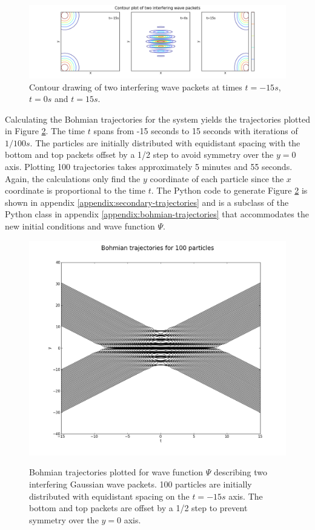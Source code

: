 \documentclass[10pt, reqno]{article}
\begin{document}
  \begin{figure}[!ht]
    \centerline{\includegraphics[scale=.5]{./imgs/contour-plot.png}}
    \caption{
      Contour drawing of two interfering wave packets at times $t=-15s$, $t=0s$ and $t=15s$.
    }
    \label{fig:interfering}
  \end{figure}

  Calculating the Bohmian trajectories for the system yields the trajectories plotted in Figure \ref{fig:interfering-trajectories}.
  The time $t$ spans from -15 seconds to 15 seconds with iterations of $1/100s$.
  The particles are initially distributed with equidistant spacing with the bottom and top packets offset by a 1/2 step to avoid symmetry over the $y=0$ axis.
  Plotting 100 trajectories takes approximately 5 minutes and 55 seconds.
  Again, the calculations only find the $y$ coordinate of each particle since the $x$ coordinate is proportional to the time $t$. 
  The Python code to generate Figure \ref{fig:interfering-trajectories} is shown in appendix \ref{appendix:secondary-trajectories} and is a 
    subclass of the Python class in appendix \ref{appendix:bohmian-trajectories} that accommodates the new initial conditions and wave function $\Psi$.

  \begin{figure}[ht]
    {\centering \includegraphics[scale=.5]{./imgs/100-bohmian-trajectories-b06f0d2cb50ffe27.png} \\}
    \caption{
      Bohmian trajectories plotted for wave function $\Psi$ describing two interfering Gaussian wave packets.
      100 particles are initially distributed with equidistant spacing on the $t=-15s$ axis.
      The bottom and top packets are offset by a 1/2 step to prevent symmetry over the $y=0$ axis.
    }
    \label{fig:interfering-trajectories}
  \end{figure}
\end{document}

